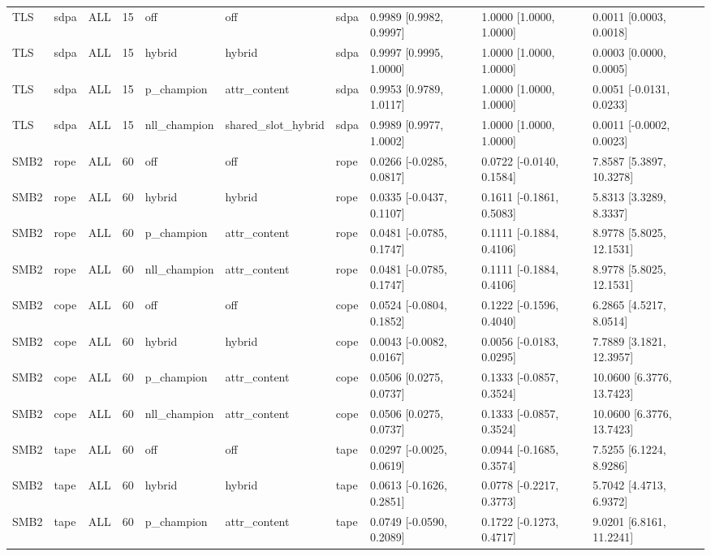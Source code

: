\begin{tabular}{llllllllll}
TLS & sdpa & ALL & 15 & off & off & sdpa & 0.9989 [0.9982, 0.9997] & 1.0000 [1.0000, 1.0000] & 0.0011 [0.0003, 0.0018] \\
TLS & sdpa & ALL & 15 & hybrid & hybrid & sdpa & 0.9997 [0.9995, 1.0000] & 1.0000 [1.0000, 1.0000] & 0.0003 [0.0000, 0.0005] \\
TLS & sdpa & ALL & 15 & p\_champion & attr\_content & sdpa & 0.9953 [0.9789, 1.0117] & 1.0000 [1.0000, 1.0000] & 0.0051 [-0.0131, 0.0233] \\
TLS & sdpa & ALL & 15 & nll\_champion & shared\_slot\_hybrid & sdpa & 0.9989 [0.9977, 1.0002] & 1.0000 [1.0000, 1.0000] & 0.0011 [-0.0002, 0.0023] \\
SMB2 & rope & ALL & 60 & off & off & rope & 0.0266 [-0.0285, 0.0817] & 0.0722 [-0.0140, 0.1584] & 7.8587 [5.3897, 10.3278] \\
SMB2 & rope & ALL & 60 & hybrid & hybrid & rope & 0.0335 [-0.0437, 0.1107] & 0.1611 [-0.1861, 0.5083] & 5.8313 [3.3289, 8.3337] \\
SMB2 & rope & ALL & 60 & p\_champion & attr\_content & rope & 0.0481 [-0.0785, 0.1747] & 0.1111 [-0.1884, 0.4106] & 8.9778 [5.8025, 12.1531] \\
SMB2 & rope & ALL & 60 & nll\_champion & attr\_content & rope & 0.0481 [-0.0785, 0.1747] & 0.1111 [-0.1884, 0.4106] & 8.9778 [5.8025, 12.1531] \\
SMB2 & cope & ALL & 60 & off & off & cope & 0.0524 [-0.0804, 0.1852] & 0.1222 [-0.1596, 0.4040] & 6.2865 [4.5217, 8.0514] \\
SMB2 & cope & ALL & 60 & hybrid & hybrid & cope & 0.0043 [-0.0082, 0.0167] & 0.0056 [-0.0183, 0.0295] & 7.7889 [3.1821, 12.3957] \\
SMB2 & cope & ALL & 60 & p\_champion & attr\_content & cope & 0.0506 [0.0275, 0.0737] & 0.1333 [-0.0857, 0.3524] & 10.0600 [6.3776, 13.7423] \\
SMB2 & cope & ALL & 60 & nll\_champion & attr\_content & cope & 0.0506 [0.0275, 0.0737] & 0.1333 [-0.0857, 0.3524] & 10.0600 [6.3776, 13.7423] \\
SMB2 & tape & ALL & 60 & off & off & tape & 0.0297 [-0.0025, 0.0619] & 0.0944 [-0.1685, 0.3574] & 7.5255 [6.1224, 8.9286] \\
SMB2 & tape & ALL & 60 & hybrid & hybrid & tape & 0.0613 [-0.1626, 0.2851] & 0.0778 [-0.2217, 0.3773] & 5.7042 [4.4713, 6.9372] \\
SMB2 & tape & ALL & 60 & p\_champion & attr\_content & tape & 0.0749 [-0.0590, 0.2089] & 0.1722 [-0.1273, 0.4717] & 9.0201 [6.8161, 11.2241] \\

\end{tabular}

